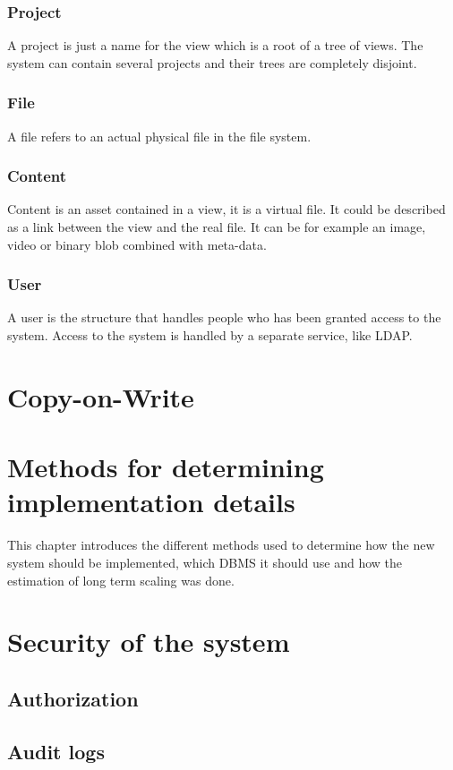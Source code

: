 \documentclass[a4paper,12pt]{article}
\begin{document}
\subsubsection{Project}
A project is just a name for the view which is a root of a tree of views.
The system can contain several projects and their trees are completely disjoint.

\subsubsection{File}
A file refers to an actual physical file in the file system.

\subsubsection{Content}
Content is an asset contained in a view, it is a virtual file.
It could be described as a link between the view and the real file. 
It can be for example an image, video or binary blob combined with meta-data.

\subsubsection{User}
A user is the structure that handles people who has been granted access to the system.
Access to the system is handled by a separate service, like LDAP.

\section{Copy-on-Write}

\section{Methods for determining\\implementation details}
This chapter introduces the different methods used to determine how the new system should be implemented, 
which DBMS it should use and how the estimation of long term scaling was done.

\section{Security of the system}
\subsection{Authorization}
\subsection{Audit logs}
\end{document}
